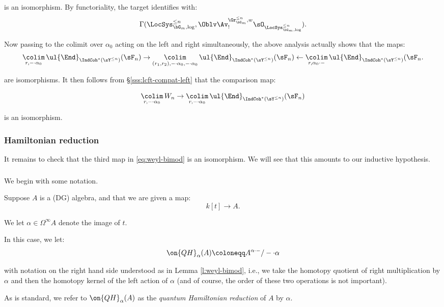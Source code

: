  is an isomorphism. By functoriality, the target identifies with:
%
\[
\Gamma(\LocSys_{\bG_m,\log}^{\leq n},
\Oblv \Av_!^{\Gr_{\bG_m}^{\leq n},w}
\sO_{\LocSys_{\bG_m,\log}^{\leq n}}).
\]

Now passing to the colimit over $\alpha_0$ acting on the left and
right simultaneously, the above analysis actually shows that the maps:
%
\[
\underset{r,-\cdot \alpha_0}{\colim} \, \ul{\End}_{\IndCoh^*(\sY^{\leq n})}(\sF_n)
\to \underset{(r_1,r_2),-\cdot \alpha_0,-\cdot \alpha_0}{\colim} \, \ul{\End}_{\IndCoh^*(\sY^{\leq n})}(\sF_n)
\leftarrow
\underset{r,\alpha_0 \cdot -}{\colim} \, \ul{\End}_{\IndCoh^*(\sY^{\leq n})}(\sF_n.
\]

 are isomorphisms. It then follows from \S \ref{sss:lcft-compat-left} that
the comparison map:

\[
\underset{r,-\cdot \alpha_0}{\colim} \, W_n \to
\underset{r,-\cdot \alpha_0}{\colim} \, \ul{\End}_{\IndCoh^*(\sY^{\leq n})}(\sF_n)
\]

 is an isomorphism.

\subsubsection{Hamiltonian reduction}

It remains to check that the third map in \eqref{eq:weyl-bimod}
is an isomorphism. We will see that this amounts to our
inductive hypothesis.

\subsubsection{}\label{sss:qh-1}

We begin with some notation.

Suppose $A$ is a (DG) algebra, and that we are given a map:
%
\[
k[t] \to A.
\]

 We let $\alpha \in \Omega^{\infty} A$ denote the image of $t$.

In this case, we let:
%
\[
\on{QH}_{\alpha}(A) \coloneqq A^{\alpha\cdot-}/-\cdot \alpha
\]

 with notation on the right hand side understood as
in Lemma \ref{l:weyl-bimod}, i.e., we take the homotopy quotient of
right multiplication by $\alpha$ and then the homotopy kernel of the
left action of $\alpha$ (and of course, the order of these two operations is
not important).

As is standard, we refer to $\on{QH}_{\alpha}(A)$
as the \emph{quantum Hamiltonian reduction}
of $A$ by $\alpha$.

